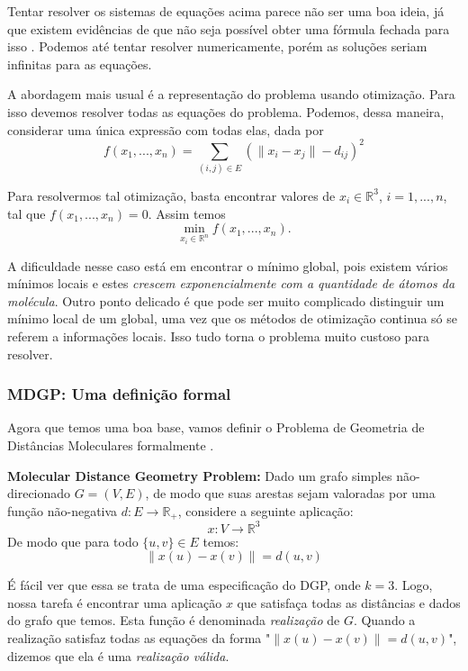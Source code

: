 \documentclass[a4paper,12pt]{article}
\begin{document}
\begin{itemize}
		Tentar resolver os sistemas de equações acima parece não ser uma boa ideia, já que existem evidências de que não seja possível obter uma fórmula fechada para isso \cite{carlileBook31Coloquio}. Podemos até tentar resolver numericamente, porém as soluções seriam infinitas para as equações.
		
		A abordagem mais usual é a representação do problema usando otimização. Para isso devemos  resolver todas as equações do problema. Podemos, dessa maneira, considerar uma única expressão com todas elas, dada por
		$$ f(x_1, ...,x_n) \equal \sum_{(i,j) \in E} (\|x_i - x_j\| - d_{ij})^2
		$$
		
		Para resolvermos tal otimização, basta encontrar valores de $x_i \in \mathbb{R}^3$, $i = 1, ..., n$, tal que $f(x_1, ...,x_n)=0.$ Assim temos
		$$ \min_{x_i \in\mathbb{R}^n} f(x_1, ...,x_n).
		$$
		
		A dificuldade nesse caso está em encontrar o mínimo global, pois existem vários mínimos locais e estes\textit{ crescem exponencialmente com a  quantidade de átomos da molécula}. Outro ponto delicado é que pode ser muito complicado distinguir um mínimo local de um global, uma vez que os métodos de otimização continua só se referem a informações locais. Isso tudo torna o problema muito custoso para resolver.
	\end{itemize}
	
	\subsubsection{MDGP: Uma definição formal}
	Agora que temos uma boa base, vamos definir o Problema de Geometria de Distâncias Moleculares formalmente \cite{carlileBook31Coloquio}.
	
	\begin{center}
		\begin{minipage}{0.9 \linewidth}
			\textbf{Molecular Distance Geometry Problem:} Dado um grafo simples não-direcionado $G=(V,E)$, de modo que suas arestas sejam valoradas por uma função não-negativa $d:E\rightarrow\mathbb{R_+}$, considere a seguinte aplicação:
			$$x:V\rightarrow\mathbb{R}^3
			$$
			De modo que para todo $\{u,v\}\in E$ temos:
			$$\|x(u)-x(v)\|=d({u,v})
			$$
		\end{minipage}
	\end{center}

	É fácil ver que essa se trata de uma especificação do DGP, onde $k = 3$. Logo, nossa tarefa é encontrar uma aplicação $x$ que satisfaça todas as distâncias e dados do grafo que temos. Esta função é denominada \textit{realização} de $G$. Quando a realização satisfaz todas as equações da forma "$\|x(u)-x(v)\|=d({u,v})$", dizemos que ela é uma \textit{realização válida}.
	
\end{document}
